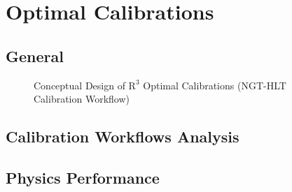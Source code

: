 \chapter{Optimal Calibrations}
\section{General} %



\begin{figure}[h!]	
\centering
\caption{Conceptual Design of $\mathrm{R}^{3}$ Optimal Calibrations (NGT-HLT Calibration Workflow)}
\label{fig:NGT-HLT_CalibrationWorkflow}
\end{figure}

\section{Calibration Workflows Analysis}


%

\section{Physics Performance}

